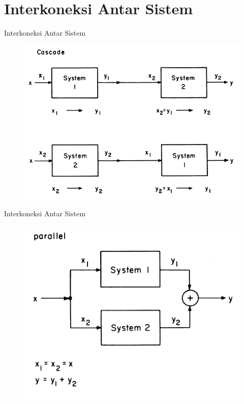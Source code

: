 \documentclass[aspectratio=169]{beamer}
\begin{document}
\section{Interkoneksi Antar Sistem}
\begin{frame}{Interkoneksi Antar Sistem}
	\begin{figure}
		\centering
		\includegraphics[height=0.8\textheight]{gambar/02.sistem/02.slide_10}
	\end{figure}
\end{frame}

\begin{frame}{Interkoneksi Antar Sistem}
	\begin{figure}
		\centering
		\includegraphics[height=0.8\textheight]{gambar/02.sistem/02.slide_11}
	\end{figure}
\end{frame}
\end{document}
